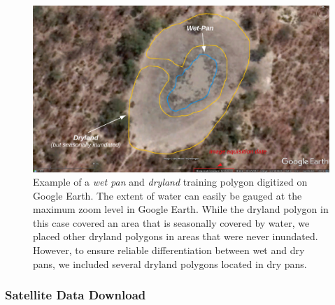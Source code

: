 \documentclass[abstract=on,10pt,a4paper,bibliography=totocnumbered]{article}
\begin{document}
\begin{figure}[htbp]
 \begin{center}
  \includegraphics[width = \textwidth]{Figures/PanMapping.pdf}
  \caption{Example of a \textit{wet pan} and \textit{dryland} training polygon
  digitized on Google Earth. The extent of water can easily be gauged at the
  maximum zoom level in Google Earth. While the dryland polygon in this case
  covered an area that is seasonally covered by water, we placed other dryland
  polygons in areas that were never inundated. However, to ensure reliable
  differentiation between wet and dry pans, we included several dryland polygons
  located in dry pans.}
  \label{PanMapping}
 \end{center}
\end{figure}

\subsubsection{Satellite Data Download}
\label{Download}
\end{document}
